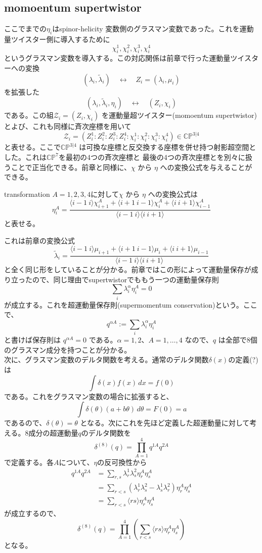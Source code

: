 \documentclass[uplatex,dvipdfmx,a4paper,11pt]{jsarticle}
\numberwithin{equation}{section}
\begin{document}
\subsection{momoentum supertwistor}
ここでまでの$\eta_i$はspinor-helicity 変数側のグラスマン変数であった。これを運動量ツイスター側に導入するために
\[
\chi_i^1,\chi_i^2,\chi_i^3,\chi_i^4
\]
というグラスマン変数を導入する。この対応関係は前章で行った運動量ツイスターへの変換
\[
(\lambda_i,\tilde\lambda_i)
\quad\longleftrightarrow\quad
Z_i=(\lambda_i,\mu_i)
\]
を拡張した
\[
(\lambda_i,\tilde\lambda_i,\eta_i)
\quad\longleftrightarrow\quad
(Z_i,\chi_i)
\]
である。この組$\mathcal Z_i=(Z_i,\chi_i)$ を運動量超ツイスター(momoentum supertwistor)とよび、これも同様に斉次座標を用いて
\[
\mathcal Z_i
=
(Z_i^1:Z_i^2:Z_i^3:Z_i^4:
\chi_i^1:\chi_i^2:\chi_i^3:\chi_i^4)
\in\mathbb{CP}^{3|4}
\]
と表せる。ここで\(\mathbb{CP}^{3|4}\) は可換な座標と反交換する座標を併せ持つ射影超空間とした。これは\(\mathbb{CP}^{7}\)を最初の4つの斉次座標と
最後の4つの斉次座標とを別々に扱うことで正当化できる。前章と同様に、\(\chi\) から \(\eta\) への変換公式を与えることができる。
\begin{mythm}{transformation}
  $A=1,2,3,4$に対して\(\chi\) から \(\eta\) への変換公式は
  \[
\eta_i^A
=
\frac{
\langle i-1\ i\rangle\chi_{i+1}^A
+\langle i+1\ i-1\rangle\chi_i^A
+\langle i\ i+1\rangle\chi_{i-1}^A
}{
\langle i-1\ i\rangle\langle i\ i+1\rangle
}
\]
と表せる。
\end{mythm}
これは前章の変換公式
\[
\tilde\lambda_i
=
\frac{
\langle i-1\ i\rangle\mu_{i+1}
+\langle i+1\ i-1\rangle\mu_i
+\langle i\ i+1\rangle\mu_{i-1}
}{
\langle i-1\ i\rangle\langle i\ i+1\rangle
}
\]
と全く同じ形をしていることが分かる。前章ではこの形によって運動量保存が成り立ったので、同じ理由でsupertwistorでももう一つの運動量保存則
\[
\sum_i\lambda_i^\alpha\eta_i^A=0
\]
が成立する。これを超運動量保存則(supermomentum conservation)という。ここで、
\[
q^{\alpha A}:=\sum_i\lambda_i^\alpha\eta_i^A
\]
と書けば保存則は \(q^{\alpha A}=0\) である。\(\alpha=1,2\)、\(A=1,\ldots,4\) なので、\(q\) は全部で8個のグラスマン成分を持つことが分かる。\\
次に、グラスマン変数のデルタ関数を考える。通常のデルタ関数$\delta(x)$の定義(?)は
\[
\int \delta(x) f(x) \,dx = f(0)
\]
である。これをグラスマン変数の場合に拡張すると、
\[
\int\delta(\theta)(a+b\theta)\,d\theta = F(0) = a
\]
であるので、$\delta(\theta) = \theta$ となる。次にこれを先ほど定義した超運動量に対して考える。8成分の超運動量$q$のデルタ関数を
\[
\delta^{(8)}(q)
=
\prod_{A=1}^{4}q^{1A}q^{2A}
\]
で定義する。各$A$について、$\eta$の反可換性から
\[
\begin{aligned}
q^{1A}q^{2A}
&=
\sum_{r,s}
\lambda_r^1\lambda_s^2
\eta_r^A\eta_s^A\\
&=
\sum_{r<s}
\left(
\lambda_r^1\lambda_s^2
-\lambda_s^1\lambda_r^2
\right)
\eta_r^A\eta_s^A\\
&=
\sum_{r<s}
\langle rs\rangle\eta_r^A\eta_s^A
\end{aligned}
\]
が成立するので、
\begin{equation}
\delta^{(8)}(q)
=
\prod_{A=1}^{4}
\left(
\sum_{r<s}
\langle rs\rangle\eta_r^A\eta_s^A
\right)
\end{equation}
となる。
\end{document}
